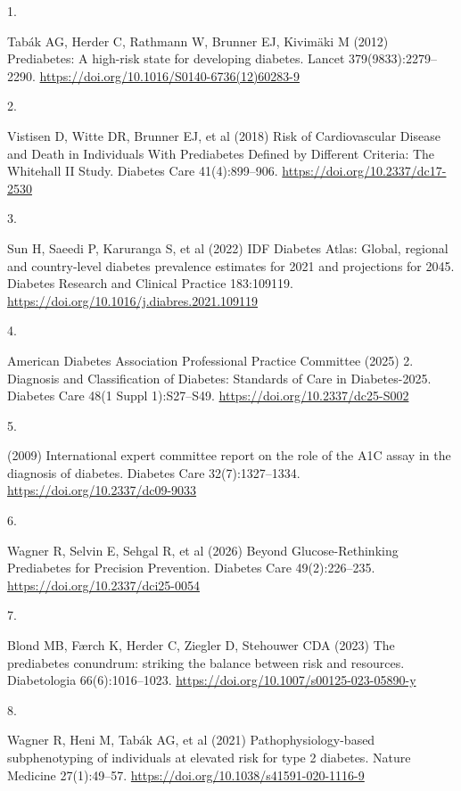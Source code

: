 \documentclass[
  12pt,
  letterpaper,
  DIV=11,
  numbers=noendperiod]{scrartcl}
\newlength{\cslhangindent}
\newlength{\csllabelwidth}
\newenvironment{CSLReferences}[2] %
 {\begin{list}{}{%
  \setlength{\itemindent}{0pt}
  \setlength{\leftmargin}{0pt}
  \setlength{\parsep}{0pt}
  \ifodd #1
   \setlength{\leftmargin}{\cslhangindent}
   \setlength{\itemindent}{-1\cslhangindent}
  \fi
  \setlength{\itemsep}{#2\baselineskip}}}
 {\end{list}}
\newcommand{\CSLLeftMargin}[1]{\parbox[t]{\csllabelwidth}{\strut#1\strut}}
\newcommand{\CSLRightInline}[1]{\parbox[t]{\linewidth - \csllabelwidth}{\strut#1\strut}}
\begin{document}
\protect{}\label{refs}
\begin{CSLReferences}{0}{1}
\CSLLeftMargin{1. }%
\CSLRightInline{Tabák AG, Herder C, Rathmann W, Brunner EJ, Kivimäki M
(2012) Prediabetes: A high-risk state for developing diabetes. Lancet
379(9833):2279--2290.
\url{https://doi.org/10.1016/S0140-6736(12)60283-9}}

\CSLLeftMargin{2. }%
\CSLRightInline{Vistisen D, Witte DR, Brunner EJ, et al (2018) Risk of
Cardiovascular Disease and Death in Individuals With Prediabetes Defined
by Different Criteria: The Whitehall II Study. Diabetes Care
41(4):899--906. \url{https://doi.org/10.2337/dc17-2530}}

\CSLLeftMargin{3. }%
\CSLRightInline{Sun H, Saeedi P, Karuranga S, et al (2022) IDF Diabetes
Atlas: Global, regional and country-level diabetes prevalence estimates
for 2021 and projections for 2045. Diabetes Research and Clinical
Practice 183:109119.
\url{https://doi.org/10.1016/j.diabres.2021.109119}}

\CSLLeftMargin{4. }%
\CSLRightInline{American Diabetes Association Professional Practice
Committee (2025) 2. Diagnosis and Classification of Diabetes: Standards
of Care in Diabetes-2025. Diabetes Care 48(1 Suppl 1):S27--S49.
\url{https://doi.org/10.2337/dc25-S002}}

\CSLLeftMargin{5. }%
\CSLRightInline{(2009) International expert committee report on the role
of the A1C assay in the diagnosis of diabetes. Diabetes Care
32(7):1327--1334. \url{https://doi.org/10.2337/dc09-9033}}

\CSLLeftMargin{6. }%
\CSLRightInline{Wagner R, Selvin E, Sehgal R, et al (2026) Beyond
Glucose-Rethinking Prediabetes for Precision Prevention. Diabetes Care
49(2):226--235. \url{https://doi.org/10.2337/dci25-0054}}

\CSLLeftMargin{7. }%
\CSLRightInline{Blond MB, Færch K, Herder C, Ziegler D, Stehouwer CDA
(2023) The prediabetes conundrum: striking the balance between risk and
resources. Diabetologia 66(6):1016--1023.
\url{https://doi.org/10.1007/s00125-023-05890-y}}

\CSLLeftMargin{8. }%
\CSLRightInline{Wagner R, Heni M, Tabák AG, et al (2021)
Pathophysiology-based subphenotyping of individuals at elevated risk for
type 2 diabetes. Nature Medicine 27(1):49--57.
\url{https://doi.org/10.1038/s41591-020-1116-9}}


\end{CSLReferences}
\end{document}
